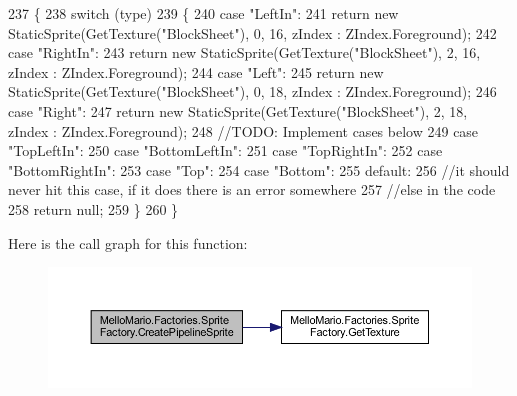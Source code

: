 \begin{DoxyCode}
237         \{
238             \textcolor{keywordflow}{switch} (type)
239             \{
240                 \textcolor{keywordflow}{case} \textcolor{stringliteral}{"LeftIn"}:
241                     \textcolor{keywordflow}{return} \textcolor{keyword}{new} StaticSprite(GetTexture(\textcolor{stringliteral}{"BlockSheet"}), 0, 16, zIndex : 
      ZIndex.Foreground);
242                 \textcolor{keywordflow}{case} \textcolor{stringliteral}{"RightIn"}:
243                     \textcolor{keywordflow}{return} \textcolor{keyword}{new} StaticSprite(GetTexture(\textcolor{stringliteral}{"BlockSheet"}), 2, 16, zIndex : 
      ZIndex.Foreground);
244                 \textcolor{keywordflow}{case} \textcolor{stringliteral}{"Left"}:
245                     \textcolor{keywordflow}{return} \textcolor{keyword}{new} StaticSprite(GetTexture(\textcolor{stringliteral}{"BlockSheet"}), 0, 18, zIndex : 
      ZIndex.Foreground);
246                 \textcolor{keywordflow}{case} \textcolor{stringliteral}{"Right"}:
247                     \textcolor{keywordflow}{return} \textcolor{keyword}{new} StaticSprite(GetTexture(\textcolor{stringliteral}{"BlockSheet"}), 2, 18, zIndex : 
      ZIndex.Foreground);
248                 \textcolor{comment}{//TODO: Implement cases below}
249                 \textcolor{keywordflow}{case} \textcolor{stringliteral}{"TopLeftIn"}:
250                 \textcolor{keywordflow}{case} \textcolor{stringliteral}{"BottomLeftIn"}:
251                 \textcolor{keywordflow}{case} \textcolor{stringliteral}{"TopRightIn"}:
252                 \textcolor{keywordflow}{case} \textcolor{stringliteral}{"BottomRightIn"}:
253                 \textcolor{keywordflow}{case} \textcolor{stringliteral}{"Top"}:
254                 \textcolor{keywordflow}{case} \textcolor{stringliteral}{"Bottom"}:
255                 \textcolor{keywordflow}{default}:
256                     \textcolor{comment}{//it should never hit this case, if it does there is an error somewhere}
257                     \textcolor{comment}{//else in the code}
258                     \textcolor{keywordflow}{return} null;
259             \}
260         \}
\end{DoxyCode}
Here is the call graph for this function\+:
\nopagebreak
\begin{figure}[H]
\begin{center}
\leavevmode
\includegraphics[width=350pt]{classMelloMario_1_1Factories_1_1SpriteFactory_a2ab8a84818855db99ff640d85c5c0388_cgraph}
\end{center}
\end{figure}
